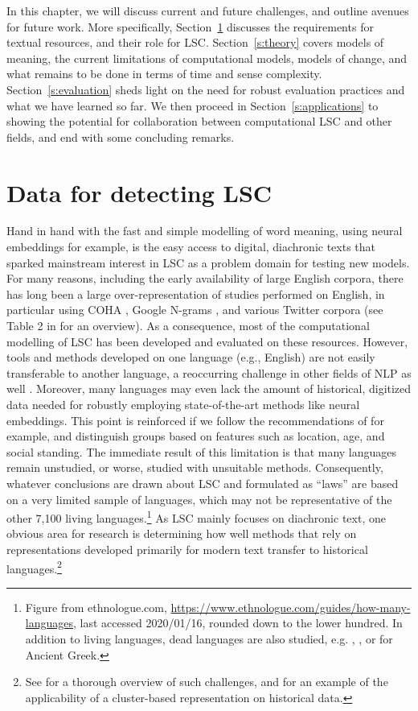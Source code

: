 \documentclass[output=paper]{langscibook}
\begin{document}
In this chapter, we will discuss current and future challenges, and outline avenues for future work. More specifically, Section~\ref{s:data} discusses the requirements for textual resources, and their role for LSC. Section~\ref{s:theory} covers models of meaning, the current limitations of computational models, models of change, and what remains to be done in terms of time and sense complexity. 
Section~\ref{s:evaluation} sheds light on the need for robust evaluation practices and what we have learned so far. 
 We then proceed in Section~\ref{s:applications} to showing the potential for collaboration between computational LSC and other fields, and end with some concluding remarks. 

\section{Data for detecting LSC}
\label{s:data}
Hand in hand with the fast and simple modelling of word meaning, 
using neural embeddings for example, is the easy access to digital, diachronic texts that sparked mainstream interest in LSC as a problem domain for testing new models. For many reasons, including the early availability of large English corpora, there has long been a large over-representation of studies performed on English, in particular using COHA \citep{davies2002corpus}, Google N-grams \citep{michel2011quantitative}, and various Twitter corpora (see Table 2 in \citealt{tahmasebi2018survey} for an overview). As a consequence, most of the computational modelling of LSC has been developed and evaluated on these resources. However, tools and methods developed on one language (e.g., English) are not easily transferable to another language, a reoccurring challenge in other fields of NLP as well \citep{bender-2011, ponti:2019cl}. Moreover, many languages may even lack the amount of historical, digitized data needed for robustly employing state-of-the-art methods like neural embeddings. This point is reinforced if we follow the recommendations of \citet{bowern2019semantic} for example, and distinguish groups based on features such as location, age, and social standing. The immediate result of this limitation is that many languages remain unstudied, or worse, studied with unsuitable methods. Consequently, whatever conclusions are drawn about LSC and formulated as ``laws'' are based on a very limited sample of languages, which may not be representative of the other 7,100 living languages.\footnote{Figure from ethnologue.com, \url{https://www.ethnologue.com/guides/how-many-languages}, last accessed 2020/01/16, rounded down to the lower hundred. In addition to living languages, dead languages are also studied, e.g. \citet{rodda2016panta-journal}, \citet{perrone-etal-2019-gasc}, or \citet{mcgillivray2019computational} for Ancient Greek.} 
As LSC mainly focuses on diachronic text, one obvious area for research is determining how well methods that rely on representations developed primarily for modern text transfer to historical languages.\footnote{See \citet{piotrowski2012natural} for a thorough overview of such challenges, and \citet{tahmasebi2013applicability} for an example of the applicability of a cluster-based representation on historical data.}\\
\end{document}
